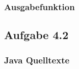 \documentclass[a4paper,
12pt,
BCOR12mm,
]{scrartcl}
\begin{document}
\subsubsection{Ausgabefunktion}
\label{src:basic}


\subsection{Aufgabe 4.2}
\subsubsection{Java Quelltexte}
\label{src:java}



\end{document}
